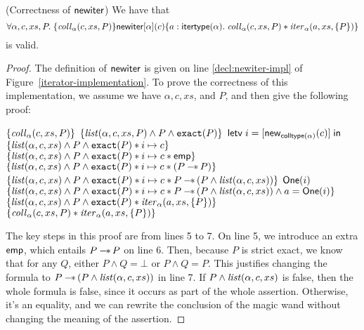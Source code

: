 \begin{lemma}{(Correctness of $\mathsf{newiter}$)}
We have that
\begin{displaymath}
\forall \alpha, c, xs, P.\; \{{\mathit{coll}_\alpha(c, xs, P)}\}{\mathsf{newiter}[\alpha](c)}\{{a:\mathsf{itertype}(\alpha)}.\;{\mathit{coll}_\alpha(c, xs, P) * 
                                  \mathit{iter}_\alpha(a, xs, \{{P}\})}\}
\end{displaymath}
is valid.
\end{lemma}

\begin{proof}
The definition of $\mathsf{newiter}$ is given on line \ref{decl:newiter-impl} of
Figure~\ref{iterator-implementation}. To prove the correctness of this
implementation, we assume we have $\alpha, c, xs$, and $P$, and then
give the following proof: 

\begin{specification}
\nextline $\{{\mathit{coll}_\alpha(c, xs, P)}\}$ 
\nextline $\{{\mathit{list}(\alpha, c, xs, P) \land P \land \mathtt{exact}({P})}\}$ 
\nextline $\mathsf{letv}\;i = [\mathsf{new}_{\mathsf{colltype}(\alpha)}(c)]\;\mathsf{in}\;$ 
\nextline $\{{\mathit{list}(\alpha, c, xs) \land P \land \mathtt{exact}({P}) * i \mapsto c}\}$ 
\nextline $\{{\mathit{list}(\alpha, c, xs) \land P \land \mathtt{exact}({P}) * i \mapsto c * \mathsf{emp}}\}$ 
\nextline $\{{\mathit{list}(\alpha, c, xs) \land P \land \mathtt{exact}({P}) * i \mapsto c * (P -\!\!*\, P)}\}$
\nextline $\{{\mathit{list}(\alpha, c, xs) \land P \land \mathtt{exact}({P}) * i \mapsto c * P -\!\!*\, (P \land \mathit{list}(\alpha, c, xs))}\}$ 
\nextline $\mathsf{One}(i)$ 
\nextline $\{{\mathit{list}(\alpha, c, xs) \land P \land \mathtt{exact}({P}) * i \mapsto c * P -\!\!*\, (P \land \mathit{list}(\alpha, c, xs)) \land a = \mathsf{One}(i)}\}$ 
\nextline $\{{\mathit{list}(\alpha, c, xs) \land P \land \mathtt{exact}({P}) * \mathit{iter}_\alpha(a, xs, \{{P}\})}\}$
\nextline $\{{\mathit{coll}_\alpha(c, xs, P) * \mathit{iter}_\alpha(a, xs, \{{P}\})}\}$
\end{specification}

The key steps in this proof are from lines 5 to 7. On line 5, we introduce an extra $\mathsf{emp}$, which
entails $P -\!\!*\, P$ on line 6. Then, because $P$ is strict exact, we know that for any $Q$, either $P \land Q = \bot$ or $P \land Q = P$. This justifies changing the formula to $P -\!\!*\, (P \land \mathit{list}(\alpha, c, xs))$ in line 7. If $P \land \mathit{list}(\alpha, c, xs)$ is false, then the whole formula is false, since it occurs as part of the whole assertion. Otherwise, it's an equality, and we can rewrite the conclusion of the magic wand without changing the meaning of the assertion.
\end{proof}

